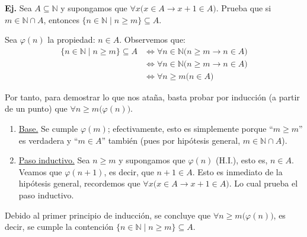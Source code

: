 \documentclass[letterpaper,DIV=18,headsepline,13pt]{scrartcl}
\makeatletter
\newcounter{Ejer}
\newcommand{\pts}{}
\newenvironment{ejercicio}[1]{\noindent
    \ifthenelse{\equal{#1}{1}}{\renewcommand{\pts}{\textbf{(#1 pt)}}}{\renewcommand{\pts}{\textbf{(#1 pts)}}}\textbf{Ej. \theEjer} \pts\stepcounter{Ejer}}{\vspace{.3cm}}
\renewenvironment{proof}[1][]{%
        \par\pushQED{\qed}%
        \normalfont\topsep6pt \partopsep0pt %
        \trivlist
        \item[\hskip\labelsep
                \textbf{\textit{Demostración.}}%
        ]#1
        }{%
        \popQED\endtrivlist\@endpefalse
    }
\makeatother
\begin{document}
    \begin{ejercicio}{+1}
        Sea $A \subseteq \mathbb{N}$ y supongamos que $\forall x \big( x \in A \to x+1 \in A \big)$. Prueba que si $m \in \mathbb{N} \cap A$, entonces $\{ n \in \mathbb{N} \mid n \geq m \} \subseteq A$.
    \end{ejercicio}
    \begin{proof}
        Sea $\varphi(n)$ la propiedad: $n \in A$. Observemos que:
        \begin{align*}
            \{ n \in \mathbb{N} \mid n \geq m \} \subseteq A & \Leftrightarrow \forall n \in \mathbb{N} \big( n \geq m \to n \in A \big) \\
            & \Leftrightarrow \forall n \in \mathbb{N} \big( n \geq m \to n \in A \big) \\
            & \Leftrightarrow \forall n \geq m \big( n \in A \big)
        \end{align*}
        
        Por tanto, para demostrar lo que nos ataña, basta probar por inducción (a partir de un punto) que $\forall n \geq m \big( \varphi(n) \big)$.
        \begin{enumerate}[\hspace{1cm}]
            \item \underline{Base.} Se cumple $\varphi(m)$; efectivamente, esto es simplemente porque ``$m \geq m$'' es verdadera y ``$m \in A$'' también (pues por hipótesis general, $m \in \mathbb{N} \cap A$).
            \item \underline{Paso inductivo.} Sea $n \geq m$ y supongamos que $\varphi(n)$ (H.I.), esto es, $n \in A$. Veamos que $\varphi(n+1)$, es decir, que $n+1 \in A$. Esto es inmediato de la hipótesis general, recordemos que $\forall x \big( x \in A \to x+1 \in A \big)$. Lo cual prueba el paso inductivo.
        \end{enumerate}
        Debido al primer principio de inducción, se concluye que $\forall n \geq m \big( \varphi(n) \big)$, es decir, se cumple la contención $\{ n \in \mathbb{N} \mid n \geq m \} \subseteq A$.
    \end{proof}
\end{document}
